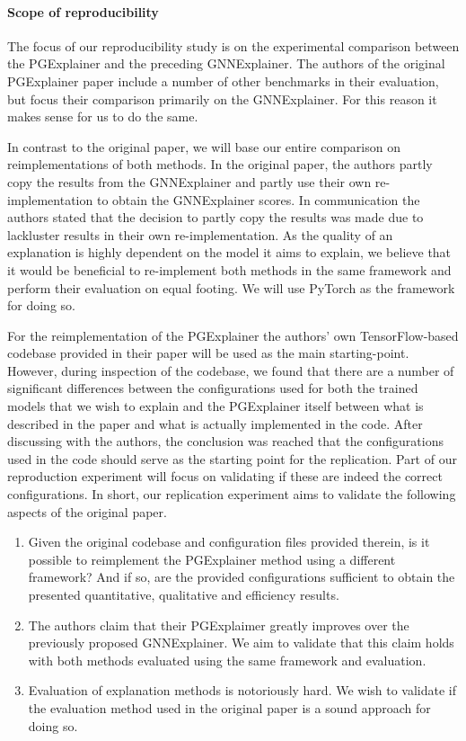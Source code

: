 \paragraph{Scope of reproducibility}\label{sec:scope}
The focus of our reproducibility study is on the experimental comparison between the PGExplainer and the preceding GNNExplainer. The authors of the original PGExplainer paper include a number of other benchmarks in their evaluation, but focus their comparison primarily on the GNNExplainer. For this reason it makes sense for us to do the same. 

In contrast to the original paper, we will base our entire comparison on reimplementations of both methods. In the original paper, the authors partly copy the results from the GNNExplainer and partly use their own re-implementation to obtain the GNNExplainer scores. In communication the authors stated that the decision to partly copy the results was made due to lackluster results in their own re-implementation. As the quality of an explanation is highly dependent on the model it aims to explain, we believe that it would be beneficial to re-implement both methods in the same framework and perform their evaluation on equal footing. We will use PyTorch as the framework for doing so. 

For the reimplementation of the PGExplainer the authors' own TensorFlow-based codebase provided in their paper will be used as the main starting-point. However, during inspection of the codebase, we found that there are a number of significant differences between the configurations used for both the trained models that we wish to explain and the PGExplainer itself between what is described in the paper and what is actually implemented in the code. After discussing with the authors, the conclusion was reached that the configurations used in the code should serve as the starting point for the replication. Part of our reproduction experiment will focus on validating if these are indeed the correct configurations. 
In short, our replication experiment aims to validate the following aspects of the original paper.

\begin{enumerate}[]
    \item Given the original codebase and configuration files provided therein, is it possible to reimplement the PGExplainer method using a different framework? And if so, are the provided configurations sufficient to obtain the presented quantitative, qualitative and efficiency results. 
    \item The authors claim that their PGExplaimer greatly improves over the previously proposed GNNExplainer. We aim to validate that this claim holds with both methods evaluated using the same framework and evaluation. 
    \item Evaluation of explanation methods is notoriously hard. We wish to validate if the evaluation method used in the original paper is a sound approach for doing so.
\end{enumerate}


